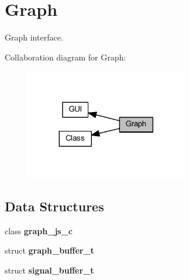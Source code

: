\section{Graph}
\label{group___graph}


Graph interface.  


Collaboration diagram for Graph\+:
\nopagebreak
\begin{figure}[H]
\begin{center}
\leavevmode
\includegraphics[width=200pt]{group___graph}
\end{center}
\end{figure}
\subsection*{Data Structures}
\begin{DoxyCompactItemize}
\item 
class \textbf{ graph\+\_\+js\+\_\+c}
\item 
struct \textbf{ graph\+\_\+buffer\+\_\+t}
\item 
struct \textbf{ signal\+\_\+buffer\+\_\+t}
\end{DoxyCompactItemize}
